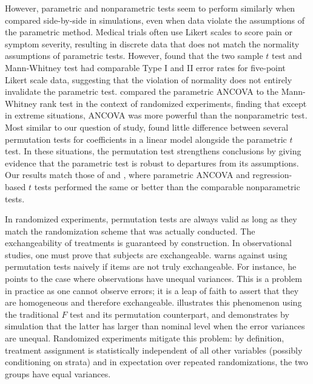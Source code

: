 \documentclass[12pt]{article}
\begin{document}
However, parametric and nonparametric tests seem to perform similarly when compared side-by-side in simulations, even when data violate the assumptions of the parametric method.
Medical trials often use Likert scales to score pain or symptom severity, resulting in discrete data that does not match the normality assumptions of parametric tests.
However, \cite{winter_five-point_2010} found that the two sample $t$ test and Mann-Whitney test had comparable Type I and II error rates for five-point Likert scale data, suggesting that the violation of normality does not entirely invalidate the parametric test.
\cite{vickers_parametric_2005} compared the parametric ANCOVA to the Mann-Whitney rank test in the context of randomized experiments, finding that except in extreme situations, ANCOVA was more powerful than the nonparametric test.
Most similar to our question of study, \cite{anderson_empirical_1999} found little difference between several permutation tests for coefficients in a linear model alongside the parametric $t$ test.
In these situations, the permutation test strengthens conclusions by giving evidence that the parametric test is robust to departures from its assumptions.
Our results match those of \citet{vickers_parametric_2005} and \citet{anderson_empirical_1999}, where parametric ANCOVA and regression-based $t$ tests performed the same or better than the comparable nonparametric tests.

In randomized experiments, permutation tests are always valid as long as they match the randomization scheme that was actually conducted.
The exchangeability of treatments is guaranteed by construction.
In observational studies, one must prove that subjects are exchangeable.
\cite{romano_behavior_1990} warns against using permutation tests naively if items are not truly exchangeable. 
For instance, he points to the case where observations have unequal variances.  
This is a problem in practice as one cannot observe errors; it is a leap of faith to assert that they are homogeneous and therefore exchangeable.
\cite{boik_fisherpitman_1987} illustrates this phenomenon using the traditional $F$ test and its permutation counterpart, 
and demonstrates by simulation that the latter has larger than nominal level when the error variances are unequal.
Randomized experiments mitigate this problem: by definition, treatment assignment is statistically independent of all other variables (possibly conditioning on strata) and in expectation over repeated randomizations, the two groups have equal variances.
\end{document}
